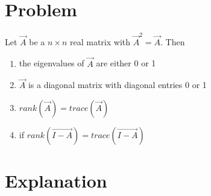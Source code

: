 \documentclass[journal,12pt,twocolumn]{IEEEtran}
\begin{document}
\section{Problem}
Let $\vec{A}$ be a $n\times n$ real matrix with $\vec{A}^2=\vec{A}$. Then
\begin{enumerate}
	\item the eigenvalues of $\vec{A}$ are either 0 or 1
	\item $\vec{A}$ is a diagonal matrix with diagonal entries 0 or 1
	\item $rank(\vec{A})=trace(\vec{A})$
	\item if $rank(\vec{I-A})=trace(\vec{I-A})$
\end{enumerate}
\section{Explanation}
\end{document}
